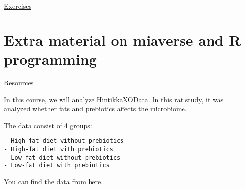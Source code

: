 \documentclass[
  oneside]{book}
\begin{document}
\href{https://microbiome.github.io/OMA/exercises.html}{Exercises}

\hypertarget{extra-material-on-miaverse-and-r-programming}{%
\section{Extra material on miaverse and R programming}\label{extra-material-on-miaverse-and-r-programming}}

\href{https://microbiome.github.io/OMA/resources.html}{Resources}

In this course, we will analyze \href{https://rdrr.io/github/microbiome/microbiomeDataSets/man/HintikkaXOData.html}{HintikkaXOData}.
In this rat study, it was analyzed whether fats and prebiotics affects the microbiome.

The data consist of 4 groups:

\begin{verbatim}
- High-fat diet without prebiotics
- High-fat diet with prebiotics
- Low-fat diet without prebiotics
- Low-fat diet with prebiotics
\end{verbatim}

You can find the data from \href{https://github.com/microbiome/course_2022_oulu/tree/main/data}{here}.

  
\end{document}
